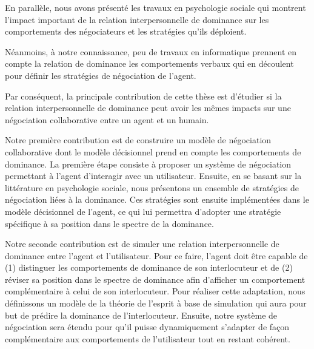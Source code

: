 			En parallèle, nous avons présenté les travaux en psychologie sociale qui montrent l'impact important de la relation interpersonnelle de dominance sur les comportements des négociateurs et les stratégies qu'ils déploient.
			
			Néanmoins, à notre connaissance, peu de travaux en informatique prennent en compte la relation de dominance les comportements verbaux qui en découlent pour définir les stratégies de négociation de l'agent.
			
			Par conséquent, la principale contribution de cette thèse est d'étudier si la relation interpersonnelle de dominance peut avoir les mêmes impacts sur une négociation collaborative entre un agent et un humain.
			
			Notre première contribution est de construire un modèle de négociation collaborative dont le modèle décisionnel prend en compte les comportements de dominance. 
			La première étape consiste à proposer un système de négociation permettant à l'agent d'interagir avec un utilisateur. 
			Ensuite, en se basant sur la littérature en psychologie sociale, nous présentons un ensemble de stratégies de négociation liées à la dominance.
			Ces stratégies sont ensuite implémentées dans le modèle décisionnel de l'agent, ce qui lui permettra d'adopter une stratégie spécifique à sa position dans le spectre de la dominance.   
			
			Notre seconde contribution est de simuler une relation interpersonnelle de dominance entre l'agent et l'utilisateur. Pour ce faire, l'agent doit être capable de (1) distinguer les comportements de dominance de son interlocuteur et  de (2) réviser sa position dans le spectre de dominance afin  d'afficher un comportement complémentaire à celui de son interlocuteur. 
			Pour réaliser cette adaptation, nous définissons un modèle de la théorie de l'esprit à base de simulation qui aura pour but de prédire la dominance de l'interlocuteur. Ensuite, notre système de négociation sera étendu pour qu'il puisse dynamiquement s'adapter de façon complémentaire aux comportements de l'utilisateur tout en restant cohérent. 
		
		
	
	  